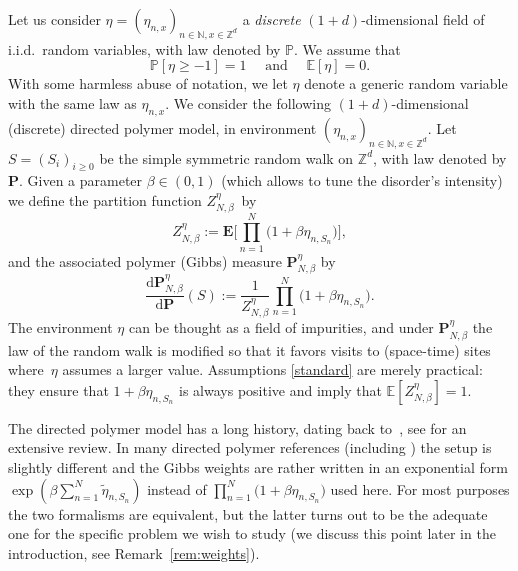 \documentclass[11pt]{article}
\numberwithin{equation}{section}
\theoremstyle{definition}
\newcommand{\dd}{\mathrm{d}}
\newcommand{\bP}{{\ensuremath{\mathbf P}} }
\newcommand{\bE}{{\ensuremath{\mathbf E}} }
\newcommand{\bbE}{{\ensuremath{\mathbb E}} }
\newcommand{\bbN}{{\ensuremath{\mathbb N}} }
\newcommand{\bbP}{{\ensuremath{\mathbb P}} }
\newcommand{\bbZ}{{\ensuremath{\mathbb Z}} }
\begin{document}
Let us consider $\eta=(\eta_{n,x})_{n\in \bbN, x\in \bbZ^d}$ a \emph{discrete} $(1+d)$-dimensional field of i.i.d.\ random variables, with law denoted by $\bbP$.
We assume that
\begin{equation} \label{standard}
\bbP[\eta \ge -1]=1 \quad \text{ and } \quad \bbE[\eta]=0.
\end{equation}
With some harmless abuse of notation, we let $\eta$ denote a generic random variable with the same law as $\eta_{n,x}$.
We consider the following $(1+d)$-dimensional (discrete) directed polymer model, in environment $(\eta_{n,x})_{n\in \bbN, x\in \bbZ^d}$.
Let $S=(S_i)_{i\geq 0}$ be the simple symmetric random walk on $\bbZ^d$, with law denoted by $\bP$.
Given a parameter $\beta\in (0,1)$ (which allows to tune the disorder's intensity) we define the partition function $Z^{\eta}_{N,\beta}$~by\vspace*{-3pt}\enlargethispage{.3\baselineskip}%
%
\begin{equation}
\label{def:Zn}
Z^{\eta}_{N,\beta}:= \bE\biggl[\prod_{n=1}^N \bigl(1+\beta \eta_{n,S_n} \bigr) \biggr],
\end{equation}
and the associated polymer (Gibbs) measure $\bP^{\eta}_{N,\beta}$ by\vspace*{-3pt}
\begin{equation}\label{polymers}
\frac{ \dd \bP^{\eta}_{N,\beta}}{\dd \bP}(S):=\frac{1}{Z^{\eta}_{N,\beta}} \prod_{n=1}^N \bigl(1+\beta \eta_{n,S_n} \bigr).
\end{equation}
The environment $\eta$ can be thought as a field of impurities, and under
$\bP^{\eta}_{N,\beta}$ the law of the random walk is modified so that it favors visits to (space-time) sites where~$\eta$ assumes a larger value. Assumptions \eqref{standard} are merely practical:
they ensure that $1+\beta \eta_{n,S_n}$ is always positive and imply that $\bbE [ Z^{\eta}_{N,\beta}]=1$.

The directed polymer model has a long history, dating back to~\cite{HH85}, see \cite{C17} for an extensive review. In many directed polymer references (including \cite{C17}) the setup is slightly different and the Gibbs weights are rather written in an exponential form $\exp(\beta \sum_{n=1}^{N} \tilde\eta_{n,S_n})$ instead of $\prod_{n=1}^N \bigl(1+\beta \eta_{n,S_n} \bigr)$ used here.
For most purposes the two formalisms are equivalent, but the latter turns out to be the adequate one for the specific problem we wish to study (we discuss this point later in the introduction, see Remark~\ref{rem:weights}).
\end{document}
